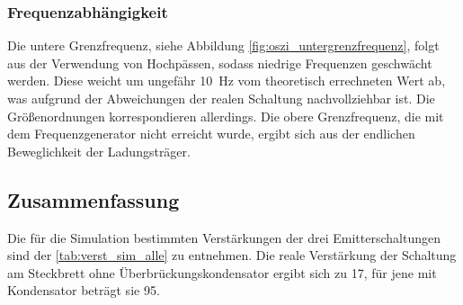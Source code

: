 \documentclass[12pt,english,ngerman]{scrartcl}
\begin{document}

\subsubsection{Frequenzabhängigkeit}
Die untere Grenzfrequenz, siehe Abbildung \autoref{fig:oszi_untergrenzfrequenz}, folgt aus der Verwendung von Hochpässen, 
sodass niedrige Frequenzen geschwächt werden. Diese weicht um ungefähr \SI{10}{\hertz} vom theoretisch errechneten Wert ab,
was aufgrund der Abweichungen der realen Schaltung nachvollziehbar ist. Die Größenordnungen korrespondieren allerdings.
Die obere Grenzfrequenz, die mit dem Frequenzgenerator nicht erreicht wurde, ergibt sich aus der endlichen Beweglichkeit 
der Ladungsträger.




\subsection{Zusammenfassung}
Die für die Simulation bestimmten Verstärkungen der drei Emitterschaltungen sind der \autoref{tab:verst_sim_alle} zu
entnehmen. Die reale Verstärkung der Schaltung am Steckbrett ohne Überbrückungskondensator ergibt sich zu \num{17}, für jene
mit Kondensator beträgt sie \num{95}.

\newpage

\printbibliography

\listoffigures

\listoftables
\end{document}
